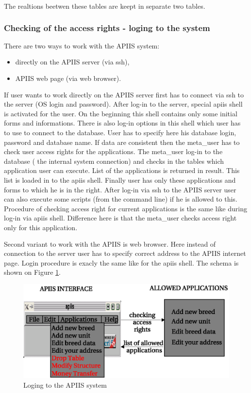 The realtions beetwen these tables are keept in separate two tables.

\subsubsection{Checking of the access rights - loging to the system}
There are two ways to work with the APIIS system:
\begin{itemize}
\item directly on the APIIS server (via ssh),
\item APIIS web page (via web browser). 
\end{itemize}

If user wants to work directly on the APIIS server first has to connect via ssh to the server (OS login and password). After log-in to the server, special apiis shell is activated for the user. On the beginning this shell contains only some initial forms and informations. There is also log-in options in this shell which user has to use to connect to the database. User has to specify here his database login, password and database name. If data are consistent then the meta\_user has to check user access rights for the applications. The meta\_user log-in to the database ( the internal system connection) and checks in the tables which application user can execute. List of the applications is returned in result. This list is loaded in to the apiis shell. Finally user has only these applications and forms to which he is in the right.
After log-in via ssh to the APIIS server user can also execute some scripts (from the command line) if he is allowed to this. Procedure of checking access right for current applications is the same like during log-in via apiis shell. Difference here is that the meta\_user checks access right only for this application.  

Second variant to work with the APIIS is web browser. Here instead of connection to the server user has to specify correct address to the APIIS internet page. Login procedure is exacly the same like for the apiis shell. The
schema is shown on Figure \ref{fig:serverloging}.
\begin{figure}[h]
\begin{center}
   \includegraphics[scale=1]{./access-control/serverloging.eps}
   \caption{Loging to the APIIS system}
   \label{fig:serverloging}
\end{center}
\end{figure}


